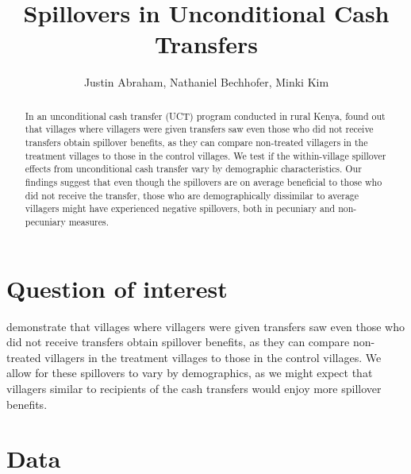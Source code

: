 \documentclass[11pt]{article}
\begin{document}
\title{Spillovers in Unconditional Cash Transfers}

\author{
	Justin Abraham, Nathaniel Bechhofer, Minki Kim
}

\maketitle

	\begin{abstract}

		In an unconditional cash transfer (UCT) program conducted in rural Kenya, \textcite{haushofer_short-term_2016} found out that villages where villagers were given transfers saw even those who did not receive transfers obtain spillover benefits, as they can compare non-treated villagers in the treatment villages to those in the control villages. We test if the within-village spillover effects from unconditional cash transfer vary by demographic characteristics. Our findings suggest that even though the spillovers are on average beneficial to those who did not receive the transfer, those who are demographically dissimilar to average villagers might have experienced negative spillovers, both in pecuniary and non-pecuniary measures. 

 	\end{abstract}

\newpage

\section{Question of interest}

    \textcite{haushofer_short-term_2016} demonstrate that villages where villagers were given transfers saw even those who did not receive transfers obtain spillover benefits, as they can compare non-treated villagers in the treatment villages to those in the control villages. We allow for these spillovers to vary by demographics, as we might expect that villagers similar to recipients of the cash transfers would enjoy more spillover benefits.

   
\section{Data}
\end{document}
